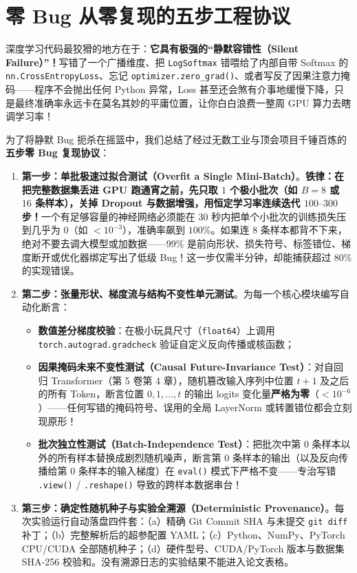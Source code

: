 \section{零 Bug 从零复现的五步工程协议}

深度学习代码最狡猾的地方在于：\textbf{它具有极强的“静默容错性（Silent Failure）”！}写错了一个广播维度、把 \texttt{LogSoftmax} 错喂给了内部自带 Softmax 的 \texttt{nn.CrossEntropyLoss}、忘记 \texttt{optimizer.zero\_grad()}、或者写反了因果注意力掩码——程序不会抛出任何 Python 异常，Loss 甚至还会煞有介事地缓慢下降，只是最终准确率永远卡在莫名其妙的平庸位置，让你白白浪费一整周 GPU 算力去瞎调学习率！

为了将静默 Bug 扼杀在摇篮中，我们总结了经过无数工业与顶会项目千锤百炼的\textbf{五步零 Bug 复现协议}：

\begin{enumerate}
  \item \textbf{第一步：单批极速过拟合测试（Overfit a Single Mini-Batch）}。\textbf{铁律：在把完整数据集丢进 GPU 跑通宵之前，先只取 $1$ 个极小批次（如 $B = 8$ 或 $16$ 条样本），关掉 Dropout 与数据增强，用恒定学习率连续迭代 $100\text{--}300$ 步！}一个有足够容量的神经网络必须能在 $30$ 秒内把单个小批次的训练损失压到几乎为 $0$（如 $< 10^{-3}$），准确率飙到 $100\%$。如果连 $8$ 条样本都背不下来，绝对不要去调大模型或加数据——99\% 是前向形状、损失符号、标签错位、梯度断开或优化器绑定写出了低级 Bug！这一步仅需半分钟，却能捕获超过 $80\%$ 的实现错误。
  \item \textbf{第二步：张量形状、梯度流与结构不变性单元测试}。为每一个核心模块编写自动化断言：
  \begin{itemize}
    \item \textbf{数值差分梯度校验}：在极小玩具尺寸（\texttt{float64}）上调用 \texttt{torch.autograd.gradcheck} 验证自定义反向传播或核函数；
    \item \textbf{因果掩码未来不变性测试（Causal Future-Invariance Test）}：对自回归 Transformer（第 5 卷第 4 章），随机篡改输入序列中位置 $t + 1$ 及之后的所有 Token，断言位置 $0, 1, \dots, t$ 的输出 logits 变化量\textbf{严格为零}（$< 10^{-6}$）——任何写错的掩码符号、误用的全局 LayerNorm 或转置错位都会立刻现原形！
    \item \textbf{批次独立性测试（Batch-Independence Test）}：把批次中第 $0$ 条样本以外的所有样本替换成剧烈随机噪声，断言第 $0$ 条样本的输出（以及反向传播给第 $0$ 条样本的输入梯度）在 \texttt{eval()} 模式下严格不变——专治写错 \texttt{.view()} / \texttt{.reshape()} 导致的跨样本数据串台！
  \end{itemize}
  \item \textbf{第三步：确定性随机种子与实验全溯源（Deterministic Provenance）}。每次实验运行自动落盘四件套：（a）精确 Git Commit SHA 与未提交 \texttt{git diff} 补丁；（b）完整解析后的超参配置 YAML；（c）Python、NumPy、PyTorch CPU/CUDA 全部随机种子；（d）硬件型号、CUDA/PyTorch 版本与数据集 SHA-256 校验和。没有溯源日志的实验结果不能进入论文表格。

\end{enumerate}
